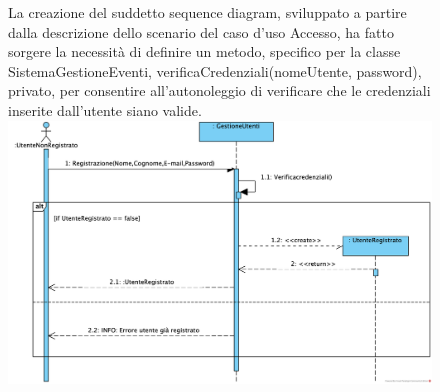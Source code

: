 \begin{figure}[!ht]
	\centering
	La creazione del suddetto sequence diagram, sviluppato a partire dalla descrizione dello scenario del caso d’uso Accesso, ha fatto sorgere la necessità di definire un metodo, specifico per la classe SistemaGestioneEventi, verificaCredenziali(nomeUtente, password), privato, per consentire all’autonoleggio di verificare che le credenziali inserite dall’utente siano valide.
	\includegraphics[width=0.8\linewidth]{assets/casid'uso/Registrazione.png}
\end{figure}


